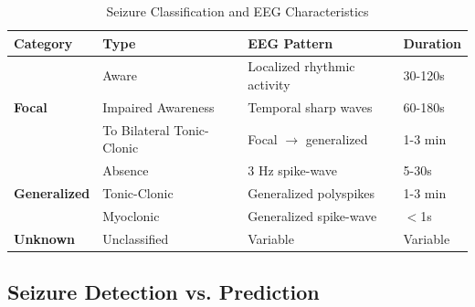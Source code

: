 \documentclass[12pt,a4paper]{article}
\begin{document}
\begin{table}[H]
\centering
\caption{Seizure Classification and EEG Characteristics}
\label{tab:seizure_types}
\begin{tabular}{llp{5cm}l}
\toprule
\textbf{Category} & \textbf{Type} & \textbf{EEG Pattern} & \textbf{Duration} \\
\midrule
\multirow{3}{*}{\textbf{Focal}} & Aware & Localized rhythmic activity & 30-120s \\
 & Impaired Awareness & Temporal sharp waves & 60-180s \\
 & To Bilateral Tonic-Clonic & Focal $\rightarrow$ generalized & 1-3 min \\
\midrule
\multirow{3}{*}{\textbf{Generalized}} & Absence & 3 Hz spike-wave & 5-30s \\
 & Tonic-Clonic & Generalized polyspikes & 1-3 min \\
 & Myoclonic & Generalized spike-wave & $<$1s \\
\midrule
\textbf{Unknown} & Unclassified & Variable & Variable \\
\bottomrule
\end{tabular}
\end{table}

\subsection{Seizure Detection vs. Prediction}
\end{document}

